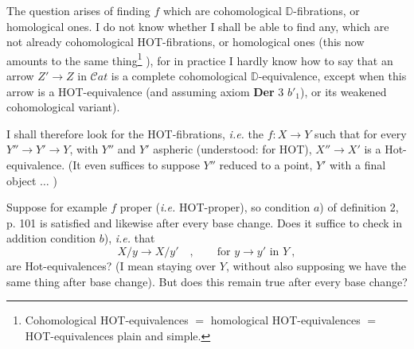 \documentclass[11pt]{article}
\newcommand{\printedpage}[1]{\marginpar{\footnotesize p.~#1}}
\newcommand{\msp}[1]{\marginpar{\footnotesize [#1]}}
\newcommand{\HOT}{\textsf{HOT}}
\newcommand{\Hot}{\textsf{Hot}}
\newcommand{\Cat}{\mathcal{C}at}
\newcommand{\DD}{\mathbb{D}}
\begin{document}
\printedpage{64}

\msp{page 107}

The question arises of finding $f$ which are cohomological $\DD$-fibrations, or homological ones. I do not know whether I shall be able to find any, which are not already cohomological \HOT-fibrations, or homological ones (this now amounts to the same thing\footnote[55]{Cohomological \HOT-equivalences $=$ homological \HOT-equivalences $=$ \HOT-equivalences plain and simple.} ), for in practice I hardly know how to say that an arrow $Z' \to Z$ in $\Cat$ is a complete cohomological $\DD$-equivalence, except when this arrow is a \HOT-equivalence (and assuming axiom \textbf{Der} 3 $b'_1$), or its weakened cohomological variant).

I shall therefore look for the \HOT-fibrations, \textit{i.e.} the $f : X \to Y$ such that for every $Y'' \to Y' \to Y$, with $Y''$ and $Y'$ aspheric (understood: for \HOT), $X'' \to X'$ is a \Hot-equivalence. (It even suffices to suppose $Y''$ reduced to a point, $Y'$ with a final object $\ldots$ )

Suppose for example $f$ proper (\textit{i.e.} \HOT-proper), so condition $a$) of definition 2, p. 101 is satisfied and likewise after every base change. Does it suffice to check in addition condition $b$), \textit{i.e.} that
\[ X/y \longrightarrow X/y' \quad , \qquad \text{for } y \to y' \text{ in } Y \ , \]
are \Hot-equivalences? (I mean staying over $Y$, without also supposing we have the same thing after base change).
\msp{page 108}
But does this remain true after every base change? %
\end{document}
